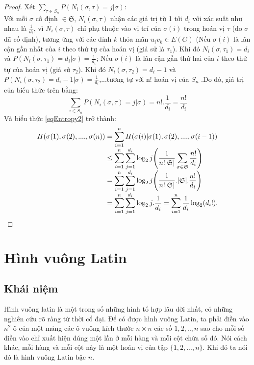 \documentclass[a4paper, 12pt]{report}
\begin{document}
\begin{proof}
Xét $\displaystyle \sum_{\tau \in S_{n}}P(N_{i}(\sigma,\tau)=j | \sigma)$:\\
Với mỗi $\sigma$ cố định $\in \mathfrak{S}$, $N_{i}(\sigma,\tau)$ nhận các giá trị từ 1 tới $d_{i}$ với xác suất như nhau là $\frac{1}{d_{i}}$, vì $N_{i}(\sigma,\tau)$ chỉ phụ thuộc vào vị trí của $\sigma(i)$ trong hoán vị $\tau$ (do $\sigma$ đã cố định), tương ứng với các đỉnh $k$ thỏa mãn $u_{i}v_{k} \in E(G)$ (Nếu  $\sigma(i)$ là lân cận gần nhất của $i$ theo thứ tự của hoán vị (giả sử là $\tau_{1}$).  Khi đó $N_{i}(\sigma,\tau_{1}) = d_{i}$ và $P(N_{i}(\sigma,\tau_{1})=d_{i} | \sigma)=\frac{1}{d_{i}}$; Nếu  $\sigma(i)$ là lân cận gần thứ hai của $i$ theo thứ tự của hoán vị (giả sử $\tau_{2}$). Khi đó $N_{i}(\sigma,\tau_{2}) = d_{i}-1$ và $P(N_{i}(\sigma,\tau_{2})=d_{i}-1 | \sigma)=\frac{1}{d_{i}}$,...tương tự với n! hoán vị của $S_{n}$ .Do đó, giá trị của biểu thức trên bằng:
\begin{equation*}
    \displaystyle \sum_{\tau \in S_{n}}P(N_{i}(\sigma,\tau)=j | \sigma)=n!.\frac{1}{d_{i}} = \frac{n!}{d_{i}}
\end{equation*}
Và biểu thức \eqref{eqEntropy2} trở thành: 
\begin{equation*}
\begin{array}{l@{}l}
H(\sigma (1), \sigma (2), ....  ,\sigma (n)) 
&{}= \displaystyle \sum_{i=1}^{n}H(\sigma (i)| \sigma (1), \sigma (2), ....  ,\sigma (i-1)) \\
&{} \leq  \displaystyle \sum_{i=1}^{n}\displaystyle \sum_{j=1}^{d_{i}}\log_{2}j \Bigg(\frac{1}{n!|\mathfrak{S}|}\displaystyle \sum_{\sigma \in \mathfrak{S}}\frac{n!}{d_{i}} \Bigg) \\
 &{}= \displaystyle \sum_{i=1}^{n}\displaystyle \sum_{j=1}^{d_{i}}\log_{2}j \Bigg(\frac{1}{n!|\mathfrak{S}|}.|\mathfrak{S}|.\frac{n!}{d_{i}} \Bigg) \\
 &{}= \displaystyle \sum_{i=1}^{n}\displaystyle \sum_{j=1}^{d_{i}}\log_{2}j.\frac{1}{d_{i}} =\displaystyle \sum_{i=1}^{n}\frac{1}{d_{i}}\log_{2}(d_{i}!). 				\qedhere
\end{array}
\end{equation*}
\end{proof}
\chapter{Hình vuông Latin}
\section{Khái niệm}
Hình vuông latin là một trong số những hình tổ hợp lâu đời nhất, có những nghiên cứu rõ ràng từ thời cổ đại. Để có được hình vuông Latin, ta phải điền vào $n^{2}$ ô của một mảng các ô vuông kích thước $n \times n$ các số $1,2,..,n$ sao cho mỗi số điền vào chỉ xuất hiện đúng một lần ở mỗi hàng và mỗi cột chứa số đó. Nói cách khác, mỗi hàng và mỗi cột này là một hoán vị của tập $\{1,2,...,n\}$. Khi đó ta nói đó là hình vuông Latin bậc $n$.
\end{document}
